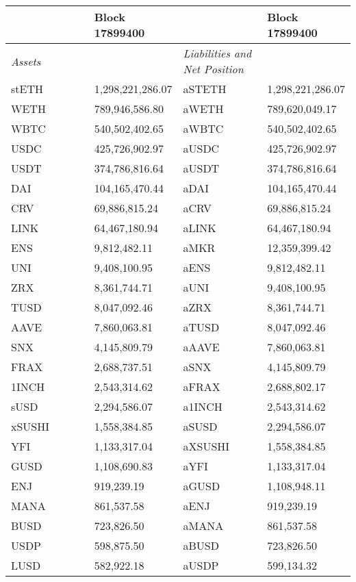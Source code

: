 
\begin{longtable}{@{}p{0.25\linewidth}p{0.25\linewidth}p{0.25\linewidth}p{0.25\linewidth}@{}}

\toprule


& Block 17899400 & & Block 17899400 \\

\midrule
\textit{Assets} & & \textit{Liabilities and Net Position} \\
stETH & 1,298,221,286.07 & aSTETH & 1,298,221,286.07 \\
WETH & 789,946,586.80 & aWETH & 789,620,049.17 \\
WBTC & 540,502,402.65 & aWBTC & 540,502,402.65 \\
USDC & 425,726,902.97 & aUSDC & 425,726,902.97 \\
USDT & 374,786,816.64 & aUSDT & 374,786,816.64 \\
DAI & 104,165,470.44 & aDAI & 104,165,470.44 \\
CRV & 69,886,815.24 & aCRV & 69,886,815.24 \\
LINK & 64,467,180.94 & aLINK & 64,467,180.94 \\
ENS & 9,812,482.11 & aMKR & 12,359,399.42 \\
UNI & 9,408,100.95 & aENS & 9,812,482.11 \\
ZRX & 8,361,744.71 & aUNI & 9,408,100.95 \\
TUSD & 8,047,092.46 & aZRX & 8,361,744.71 \\
AAVE & 7,860,063.81 & aTUSD & 8,047,092.46 \\
SNX & 4,145,809.79 & aAAVE & 7,860,063.81 \\
FRAX & 2,688,737.51 & aSNX & 4,145,809.79 \\
1INCH & 2,543,314.62 & aFRAX & 2,688,802.17 \\
sUSD & 2,294,586.07 & a1INCH & 2,543,314.62 \\
xSUSHI & 1,558,384.85 & aSUSD & 2,294,586.07 \\
YFI & 1,133,317.04 & aXSUSHI & 1,558,384.85 \\
GUSD & 1,108,690.83 & aYFI & 1,133,317.04 \\
ENJ & 919,239.19 & aGUSD & 1,108,948.11 \\
MANA & 861,537.58 & aENJ & 919,239.19 \\
BUSD & 723,826.50 & aMANA & 861,537.58 \\
USDP & 598,875.50 & aBUSD & 723,826.50 \\
LUSD & 582,922.18 & aUSDP & 599,134.32 \\

\end{longtable}
